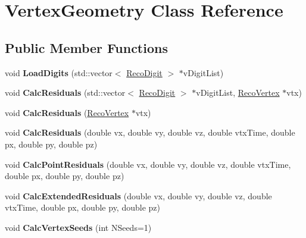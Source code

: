 \hypertarget{classVertexGeometry}{
\section{VertexGeometry Class Reference}
\label{classVertexGeometry}
}
\subsection*{Public Member Functions}
\begin{DoxyCompactItemize}
\item 
\hypertarget{classVertexGeometry_a391ed2f068240d590c3321f5c77b8bee}{
void {\bfseries LoadDigits} (std::vector$<$ \hyperlink{classRecoDigit}{RecoDigit} $>$ $\ast$vDigitList)}
\label{classVertexGeometry_a391ed2f068240d590c3321f5c77b8bee}

\item 
\hypertarget{classVertexGeometry_a779040e04233beb0ab86402d09ffdda5}{
void {\bfseries CalcResiduals} (std::vector$<$ \hyperlink{classRecoDigit}{RecoDigit} $>$ $\ast$vDigitList, \hyperlink{classRecoVertex}{RecoVertex} $\ast$vtx)}
\label{classVertexGeometry_a779040e04233beb0ab86402d09ffdda5}

\item 
\hypertarget{classVertexGeometry_a89a99bae6f82d90c70b38969af7dad72}{
void {\bfseries CalcResiduals} (\hyperlink{classRecoVertex}{RecoVertex} $\ast$vtx)}
\label{classVertexGeometry_a89a99bae6f82d90c70b38969af7dad72}

\item 
\hypertarget{classVertexGeometry_a9ac9b864c0c265f7f668e07ba0772162}{
void {\bfseries CalcResiduals} (double vx, double vy, double vz, double vtxTime, double px, double py, double pz)}
\label{classVertexGeometry_a9ac9b864c0c265f7f668e07ba0772162}

\item 
\hypertarget{classVertexGeometry_ac74f342b88fe5ffb546f93795365cbcb}{
void {\bfseries CalcPointResiduals} (double vx, double vy, double vz, double vtxTime, double px, double py, double pz)}
\label{classVertexGeometry_ac74f342b88fe5ffb546f93795365cbcb}

\item 
\hypertarget{classVertexGeometry_ac32d693630972a588b1aef9efb0709ca}{
void {\bfseries CalcExtendedResiduals} (double vx, double vy, double vz, double vtxTime, double px, double py, double pz)}
\label{classVertexGeometry_ac32d693630972a588b1aef9efb0709ca}

\item 
\hypertarget{classVertexGeometry_a61e0d6fc22938b6726699bb425129b83}{
void {\bfseries CalcVertexSeeds} (int NSeeds=1)}
\label{classVertexGeometry_a61e0d6fc22938b6726699bb425129b83}


\end{DoxyCompactItemize}
